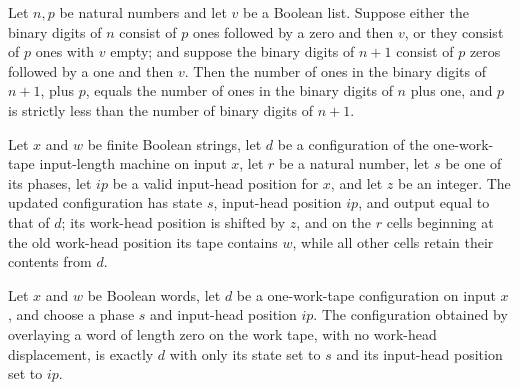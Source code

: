 \begin{theorem}
\label{Turing.inputLength_charge}
\leanok
{}
Let $n,p$ be natural numbers and let $v$ be a Boolean list. Suppose either the binary
digits of $n$ consist of $p$ ones followed by a zero and then $v$, or they consist of
$p$ ones with $v$ empty; and suppose the binary digits of $n+1$ consist of $p$ zeros
followed by a one and then $v$. Then the number of ones in the binary digits of $n+1$,
plus $p$, equals the number of ones in the binary digits of $n$ plus one, and $p$ is
strictly less than the number of binary digits of $n+1$.
\end{theorem}

\begin{definition}
\label{Turing.inputLengthCfg}
\leanok
{}
Let $x$ and $w$ be finite Boolean strings, let $d$ be a configuration of the
one-work-tape input-length machine on input $x$, let $r$ be a natural number, let $s$ be
one of its phases, let $ip$ be a valid input-head position for $x$, and let $z$ be an
integer. The updated configuration has state $s$, input-head position $ip$, and output
equal to that of $d$; its work-head position is shifted by $z$, and on the $r$ cells
beginning at the old work-head position its tape contains $w$, while all other cells
retain their contents from $d$.
\end{definition}

\begin{theorem}
\label{Turing.inputLengthCfg_zero}
\leanok
{}
Let $x$ and $w$ be Boolean words, let $d$ be a one-work-tape configuration on input $x$,
and choose a phase $s$ and input-head position $ip$. The configuration obtained by
overlaying a word of length zero on the work tape, with no work-head displacement, is
exactly $d$ with only its state set to $s$ and its input-head position set to $ip$.
\end{theorem}

